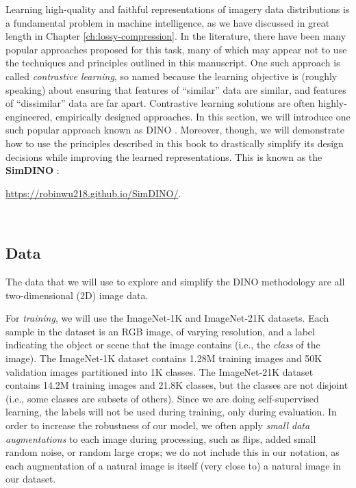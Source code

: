\documentclass[../../book-main.tex]{subfiles}
\begin{document}
Learning high-quality and faithful representations of imagery data
distributions is a fundamental problem in machine intelligence, as we
have discussed in great length in Chapter \ref{ch:lossy-compression}.
In the literature, there have been many popular approaches proposed
for this task, many of which may appear not to use the techniques and
principles outlined in this manuscript. One such approach is called
\textit{contrastive learning}, so named because the learning
objective is (roughly speaking) about ensuring that features of
``similar'' data are similar, and features of ``dissimilar'' data are
far apart. Contrastive learning solutions are often
highly-engineered, empirically designed approaches. In this section,
we will introduce one such popular approach known as DINO
\citep{caron2021emerging}. Moreover, though, we will demonstrate how
to use the principles described in this book to drastically simplify
its design decisions while improving the learned representations.
This is known as the \textbf{SimDINO} \cite{wu2025simplifying}:
\\
\centerline{\url{https://robinwu218.github.io/SimDINO/}.}\\

\subsection{Data}\label{sub:contrastive_learning_data}
The data that we will use to explore and simplify the DINO
methodology are all two-dimensional (2D) image data.

For \textit{training},
we will use the ImageNet-1K and ImageNet-21K datasets. Each sample in
the dataset is an RGB image, of varying resolution, and a label
indicating the object or scene that the image contains (i.e., the
\textit{class} of the image). The ImageNet-1K dataset contains 1.28M
training images and 50K validation images partitioned into 1K
classes. The ImageNet-21K dataset contains 14.2M training images and
21.8K classes, but the classes are not disjoint (i.e., some classes
are subsets of others). Since we are doing self-supervised learning,
the labels will not be used during training, only during evaluation.
In order to increase the robustness of our model, we often apply
\textit{small data augmentations} to each image during processing,
such as flips, added small random noise, or random large crops; we do
not include this in our notation, as each augmentation of a natural
image is itself (very close to) a natural image in our dataset.
\end{document}
